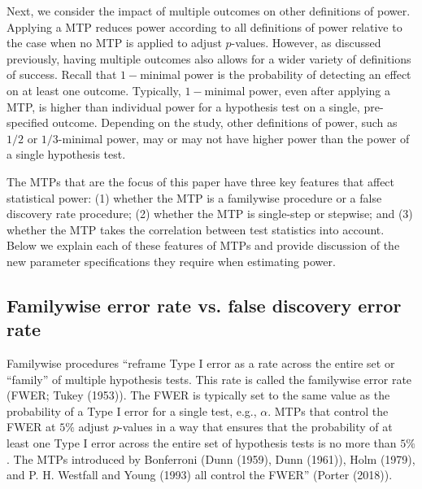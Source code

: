 \documentclass[
]{article}
\begin{document}
Next, we consider the impact of multiple outcomes on other definitions
of power. Applying a MTP reduces power according to all definitions of
power relative to the case when no MTP is applied to adjust
\(p\)-values. However, as discussed previously, having multiple outcomes
also allows for a wider variety of definitions of success. Recall that
\(1-\)minimal power is the probability of detecting an effect on at
least one outcome. Typically, \(1-\)minimal power, even after applying a
MTP, is higher than individual power for a hypothesis test on a single,
pre-specified outcome. Depending on the study, other definitions of
power, such as \(1/2\) or \(1/3\)-minimal power, may or may not have
higher power than the power of a single hypothesis test.

The MTPs that are the focus of this paper have three key features that
affect statistical power: (1) whether the MTP is a familywise procedure
or a false discovery rate procedure; (2) whether the MTP is single-step
or stepwise; and (3) whether the MTP takes the correlation between test
statistics into account. Below we explain each of these features of MTPs
and provide discussion of the new parameter specifications they require
when estimating power.

\subsection{Familywise error rate vs. false discovery error rate}

Familywise procedures ``reframe Type I error as a rate across the entire
set or ``family'' of multiple hypothesis tests. This rate is called the
familywise error rate (FWER; Tukey (1953)). The FWER is typically set to
the same value as the probability of a Type I error for a single test,
e.g., \(\alpha\). MTPs that control the FWER at \(5\%\) adjust
\(p\)-values in a way that ensures that the probability of at least one
Type I error across the entire set of hypothesis tests is no more than
\(5\%\). The MTPs introduced by Bonferroni (Dunn (1959), Dunn (1961)),
Holm (1979), and P. H. Westfall and Young (1993) all control the FWER''
(Porter (2018)).
\end{document}
